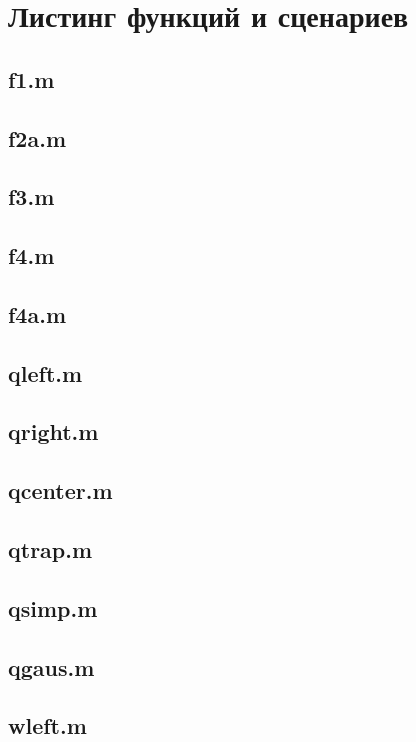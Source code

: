 \documentclass[12pt,a4paper]{article}
\begin{document}
\section{Листинг функций и сценариев}
\subsection*{f1.m}

\subsection*{f2a.m}

\subsection*{f3.m}

\subsection*{f4.m}

\subsection*{f4a.m}


\subsection*{qleft.m}

\subsection*{qright.m}

\subsection*{qcenter.m}

\subsection*{qtrap.m}

\subsection*{qsimp.m}

\subsection*{qgaus.m}


\subsection*{wleft.m}

\end{document}

